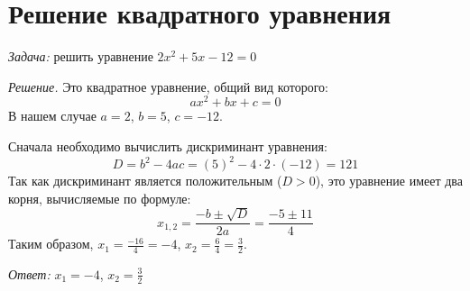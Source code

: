 \documentclass[a4paper,12pt]{article}
\begin{document}
\section{Решение квадратного уравнения}
\textit{Задача:} решить уравнение $2x^2 + 5x - 12 = 0$

\textit{Решение.} Это квадратное уравнение, общий вид которого:
\[ ax^2 + bx + c = 0 \]
В нашем случае $a = 2$, $b = 5$, $c = -12$.

Сначала необходимо вычислить дискриминант уравнения:
\[ D = b^2 - 4ac = (5)^2 - 4 \cdot 2 \cdot (-12) = 121 \]
Так как дискриминант является положительным ($D > 0$), это уравнение имеет два корня, вычисляемые по формуле:
\[ x_{1,2} = \frac{-b \pm \sqrt{D}}{2a} = \frac{-5 \pm 11}{4} \]
Таким образом, $ x_1 = \frac{-16}{4} = -4 $, $ x_2 = \frac{6}{4} = \frac{3}{2} $.

\textit{Ответ:} $ x_1 = -4$, $x_2 = \frac{3}{2} $
\end{document}
